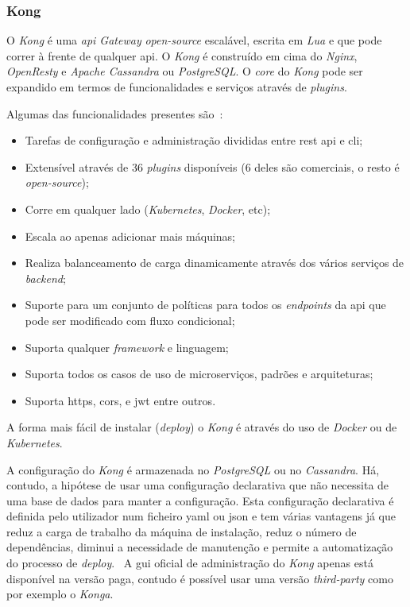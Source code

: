 \subsubsection{Kong}

O \textit{Kong} é uma \textit{\acrshort{api} Gateway} \textit{open-source} escalável, escrita em \textit{Lua} e que pode correr à frente de qualquer \acrshort{api}. O \textit{Kong} é construído em cima do \textit{Nginx}, \textit{OpenResty} e \textit{Apache Cassandra} ou \textit{PostgreSQL}. O \textit{core} do \textit{Kong} pode ser expandido em termos de funcionalidades e serviços através de \textit{plugins}.

Algumas das funcionalidades presentes são~\cite{kong}:
\begin{itemize}
    \item Tarefas de configuração e administração divididas entre \acrshort{rest} \acrshort{api} e \acrshort{cli};
    \item Extensível através de 36 \textit{plugins} disponíveis (6 deles são comerciais, o resto é \textit{open-source});
    \item Corre em qualquer lado (\textit{Kubernetes}, \textit{Docker}, etc);
    \item Escala ao apenas adicionar mais máquinas;
    \item Realiza balanceamento de carga dinamicamente através dos vários serviços de \textit{backend};
    \item Suporte para um conjunto de políticas para todos os \textit{endpoints} da \acrshort{api} que pode ser modificado com fluxo condicional;
    \item Suporta qualquer \textit{framework} e linguagem;
    \item Suporta todos os casos de uso de microserviços, padrões e arquiteturas;
    \item Suporta \acrshort{https}, \acrshort{cors}, e \acrshort{jwt} entre outros.
\end{itemize}

A forma mais fácil de instalar (\textit{deploy}) o \textit{Kong} é através do uso de \textit{Docker} ou de \textit{Kubernetes}.

A configuração do \textit{Kong} é armazenada no \textit{PostgreSQL} ou no \textit{Cassandra}. Há, contudo, a hipótese de usar uma configuração declarativa que não necessita de uma base de dados para manter a configuração. Esta configuração declarativa é definida pelo utilizador num ficheiro \acrshort{yaml} ou \acrshort{json} e tem várias vantagens já que reduz a carga de trabalho da máquina de instalação, reduz o número de dependências, diminui a necessidade de manutenção e permite a automatização do processo de \textit{deploy}.~\cite{KongDBLess} A \acrshort{gui} oficial de administração do \textit{Kong} apenas está disponível na versão paga, contudo é possível usar uma versão \textit{third-party} como por exemplo o \textit{Konga}.

